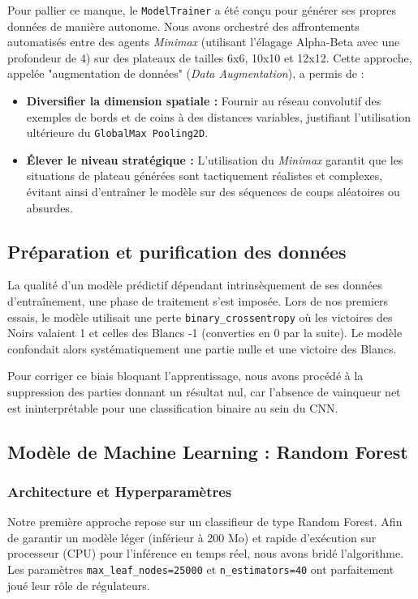 \documentclass[a4paper]{article}
\begin{document}
Pour pallier ce manque, le \texttt{ModelTrainer} a été conçu pour générer ses propres données de manière autonome. Nous avons orchestré des affrontements automatisés entre des agents \textit{Minimax} (utilisant l'élagage Alpha-Beta avec une profondeur de 4) sur des plateaux de tailles 6x6, 10x10 et 12x12. Cette approche, appelée "augmentation de données" (\textit{Data Augmentation}), a permis de :
\begin{itemize}
    \item \textbf{Diversifier la dimension spatiale :} Fournir au réseau convolutif des exemples de bords et de coins à des distances variables, justifiant l'utilisation ultérieure du \texttt{GlobalMax Pooling2D}.
    \item \textbf{Élever le niveau stratégique :} L'utilisation du \textit{Minimax} garantit que les situations de plateau générées sont tactiquement réalistes et complexes, évitant ainsi d'entraîner le modèle sur des séquences de coups aléatoires ou absurdes.
\end{itemize}

\subsection{Préparation et purification des données}
La qualité d'un modèle prédictif dépendant intrinsèquement de ses données d'entraînement, une phase de traitement s'est imposée. Lors de nos premiers essais, le modèle utilisait une perte \verb|binary_crossentropy| où les victoires des Noirs valaient 1 et celles des Blancs -1 (converties en 0 par la suite). Le modèle confondait alors systématiquement une partie nulle et une victoire des Blancs.

Pour corriger ce biais bloquant l'apprentissage, nous avons procédé à la suppression des parties donnant un résultat nul, car l'absence de vainqueur net est ininterprétable pour une classification binaire au sein du CNN.

\subsection{Modèle de Machine Learning : Random Forest}
\subsubsection{Architecture et Hyperparamètres}
Notre première approche repose sur un classifieur de type Random Forest. Afin de garantir un modèle léger (inférieur à 200 Mo) et rapide d'exécution sur processeur (CPU) pour l'inférence en temps réel, nous avons bridé l'algorithme. Les paramètres \verb|max_leaf_nodes=25000| et \verb|n_estimators=40| ont parfaitement joué leur rôle de régulateurs.
\end{document}

